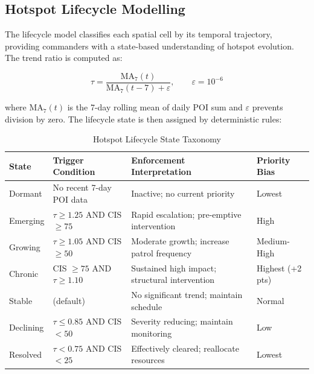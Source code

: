 \documentclass[12pt,a4paper]{article}
\begin{document}

\subsection{Hotspot Lifecycle Modelling}

The lifecycle model classifies each spatial cell by its temporal trajectory, providing
commanders with a state-based understanding of hotspot evolution. The trend ratio is computed
as:

\begin{equation}
\tau = \frac{\mathrm{MA}_7(t)}{\mathrm{MA}_7(t-7) + \varepsilon}, \qquad \varepsilon = 10^{-6}
\label{eq:trend}
\end{equation}

where $\mathrm{MA}_7(t)$ is the 7-day rolling mean of daily POI sum and $\varepsilon$
prevents division by zero. The lifecycle state is then assigned by deterministic rules:

\begin{table}[htbp]
\centering
\caption{Hotspot Lifecycle State Taxonomy}
\label{tab:lifecycle}
\begin{tabularx}{\textwidth}{@{}llXl@{}}
\toprule
\textbf{State} & \textbf{Trigger Condition} & \textbf{Enforcement Interpretation} & \textbf{Priority Bias}\\
\midrule
Dormant   & No recent 7-day POI data     & Inactive; no current priority               & Lowest\\
Emerging  & $\tau \ge 1.25$ AND CIS $\ge 75$ & Rapid escalation; pre-emptive intervention & High\\
Growing   & $\tau \ge 1.05$ AND CIS $\ge 50$ & Moderate growth; increase patrol frequency & Medium-High\\
Chronic   & CIS $\ge 75$ AND $\tau \ge 1.10$ & Sustained high impact; structural intervention & Highest (+2 pts)\\
Stable    & (default)                    & No significant trend; maintain schedule     & Normal\\
Declining & $\tau \le 0.85$ AND CIS $< 50$  & Severity reducing; maintain monitoring     & Low\\
Resolved  & $\tau < 0.75$ AND CIS $< 25$    & Effectively cleared; reallocate resources  & Lowest\\
\bottomrule
\end{tabularx}
\end{table}
\end{document}
